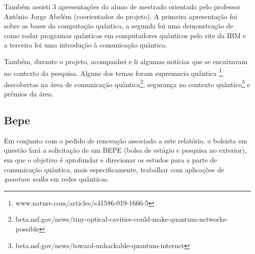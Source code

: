\documentclass{article}
\begin{document}
        Também assisti 3 apresentações do aluno de mestrado orientado pelo professor Antônio Jorge Abelém (coorientador do projeto). A primeira apresentação foi sobre as bases da computação quântica, a segunda foi uma demonstração de como rodar programas quânticos em computadores quânticos pelo site da IBM e a terceira foi uma introdução à comunicação quântica.
    
        Também, durante o projeto, acompanhei e li algumas notícias que se encaixavam no contexto da pesquisa. Alguns dos temas foram supremacia quântica \footnote{www.nature.com/articles/s41586-019-1666-5}, descobertas na área de comunicação quântica\footnote{beta.nsf.gov/news/tiny-optical-cavities-could-make-quantum-networks-possible}, segurança no contexto quântico\footnote{beta.nsf.gov/news/toward-unhackable-quantum-internet} e prêmios da área. 
        

    \subsection{Bepe}
    
        Em conjunto com o pedido de renovação associado a este relatório, o bolsista em questão fará a solicitação de um BEPE (bolsa de estágio e pesquisa no exterior), em que o objetivo é aprofundar e direcionar os estudos para a parte de comunicação quântica, mais especificamente, trabalhar com aplicações de \emph{quantum walks} em redes quânticas.

\newpage
    

\end{document}
